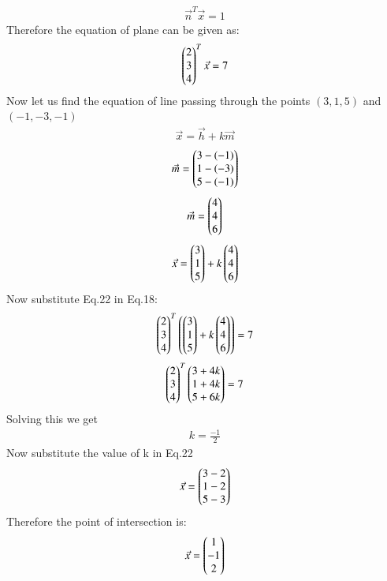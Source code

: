 \documentclass[journal]{IEEEtran}
\theoremstyle{remark}
\begin{document}
\begin{align}
\Vec{n}^T\Vec{x}=1
  \end{align}
Therefore the equation of plane can be given as:
\begin{align}
  \begin{pmatrix}2\\3\\4\end{pmatrix}^T\Vec{x}=7
\end{align}
Now let us find the equation of line passing through the points $(3,1,5)$ and $(-1,-3,-1)$
\begin{align}
    \Vec{x}=\Vec{h}+k\Vec{m}
\end{align}
\begin{align}
    \Vec{m}=\begin{pmatrix}3-(-1)\\1-(-3)\\5-(-1)\end{pmatrix}
\end{align}
\begin{align}
     \Vec{m}=\begin{pmatrix}4\\4\\6\end{pmatrix}
\end{align}
\begin{align}
    \Vec{x}=\begin{pmatrix}3\\1\\5\end{pmatrix}+k\begin{pmatrix}4\\4\\6\end{pmatrix}
\end{align}
Now substitute Eq.22 in Eq.18:
\begin{align}
    \begin{pmatrix}2\\3\\4\end{pmatrix}^T\begin{pmatrix}\begin{pmatrix}3\\1\\5\end{pmatrix}+k\begin{pmatrix}4\\4\\6\end{pmatrix}\end{pmatrix}=7
\end{align}
\begin{align}
    \begin{pmatrix}2\\3\\4\end{pmatrix}^T\begin{pmatrix}3+4k\\1+4k\\5+6k\end{pmatrix}=7
\end{align}
Solving this we get
\begin{align}
k=\frac{-1}{2}
\end{align}
Now substitute the value of k in Eq.22
\begin{align}
    \Vec{x}=\begin{pmatrix}3-2\\1-2\\5-3\end{pmatrix}
\end{align}
Therefore the point of intersection is:
\begin{align}
    \Vec{x}=\begin{pmatrix}1\\-1\\2\end{pmatrix}
\end{align}
\end{document}
